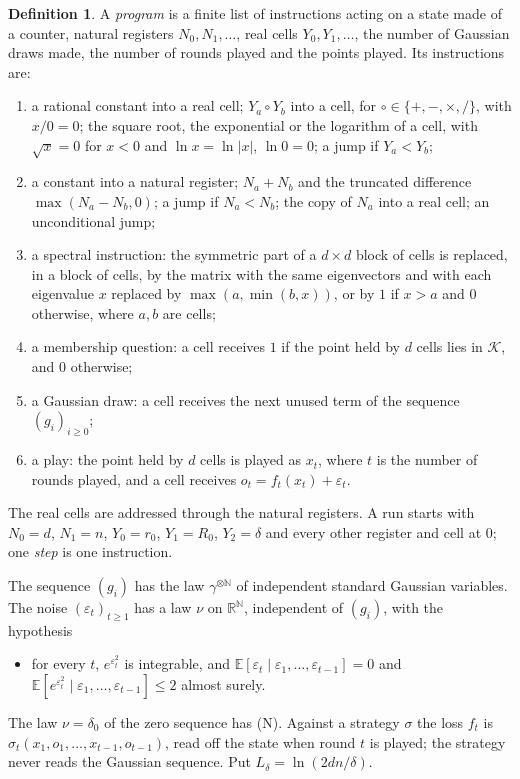 \documentclass[11pt]{amsart}
\theoremstyle{definition}
\newtheorem{definition}[theorem]{Definition}
\numberwithin{equation}{section}
\newcommand{\R}{\mathbb{R}}
\newcommand{\E}{\mathbb{E}}
\newcommand{\cK}{\mathcal{K}}
\begin{document}
\begin{definition}\label{def:realram}
A \emph{program} is a finite list of instructions acting on a state made of a counter, natural registers $N_0,N_1,\dots$, real cells $Y_0,Y_1,\dots$, the number of Gaussian draws made, the number of rounds played and the points played. Its instructions are:
\begin{enumerate}[label=(\roman*)]
\item a rational constant into a real cell; $Y_a\circ Y_b$ into a cell, for $\circ\in\{+,-,\times,/\}$, with $x/0=0$; the square root, the exponential or the logarithm of a cell, with $\sqrt x=0$ for $x<0$ and $\ln x=\ln|x|$, $\ln0=0$; a jump if $Y_a<Y_b$;
\item a constant into a natural register; $N_a+N_b$ and the truncated difference $\max(N_a-N_b,0)$; a jump if $N_a<N_b$; the copy of $N_a$ into a real cell; an unconditional jump;
\item a spectral instruction: the symmetric part of a $d\times d$ block of cells is replaced, in a block of cells, by the matrix with the same eigenvectors and with each eigenvalue $x$ replaced by $\max(a,\min(b,x))$, or by $1$ if $x>a$ and $0$ otherwise, where $a,b$ are cells;
\item a membership question: a cell receives $1$ if the point held by $d$ cells lies in $\cK$, and $0$ otherwise;
\item a Gaussian draw: a cell receives the next unused term of the sequence $(g_i)_{i\ge0}$;
\item a play: the point held by $d$ cells is played as $x_t$, where $t$ is the number of rounds played, and a cell receives $o_t=f_t(x_t)+\varepsilon_t$.
\end{enumerate}
The real cells are addressed through the natural registers. A run starts with $N_0=d$, $N_1=n$, $Y_0=r_0$, $Y_1=R_0$, $Y_2=\delta$ and every other register and cell at $0$; one \emph{step} is one instruction.
\end{definition}

The sequence $(g_i)$ has the law $\gamma^{\otimes\mathbb N}$ of independent standard Gaussian variables. The noise $(\varepsilon_t)_{t\ge1}$ has a law $\nu$ on $\R^{\mathbb N}$, independent of $(g_i)$, with the hypothesis
\begin{itemize}
\item[(N)] for every $t$, $e^{\varepsilon_t^2}$ is integrable, and $\E[\varepsilon_t\mid\varepsilon_1,\dots,\varepsilon_{t-1}]=0$ and $\E[e^{\varepsilon_t^2}\mid\varepsilon_1,\dots,\varepsilon_{t-1}]\le2$ almost surely.
\end{itemize}
The law $\nu=\delta_0$ of the zero sequence has (N). Against a strategy $\sigma$ the loss $f_t$ is $\sigma_t(x_1,o_1,\dots,\allowbreak x_{t-1},o_{t-1})$, read off the state when round $t$ is played; the strategy never reads the Gaussian sequence. Put $L_\delta=\ln(2dn/\delta)$.
\end{document}
